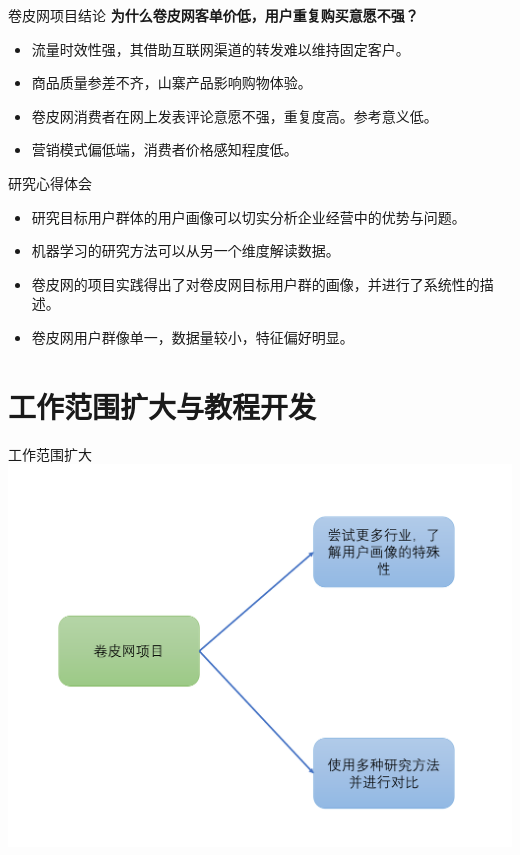 \documentclass[10pt, aspectratio=32,handout]{beamer}
\begin{document}
\begin{frame}{卷皮网项目结论}
\textbf{为什么卷皮网客单价低，用户重复购买意愿不强？}\newline
  \begin{itemize}
    \item 流量时效性强，其借助互联网渠道的转发难以维持固定客户。\newline
    \item 商品质量参差不齐，山寨产品影响购物体验。\newline
    \item 卷皮网消费者在网上发表评论意愿不强，重复度高。参考意义低。\newline
    \item 营销模式偏低端，消费者价格感知程度低。
  \end{itemize}


\end{frame}

\begin{frame}{研究心得体会}
  \begin{itemize}
    \item 研究目标用户群体的用户画像可以切实分析企业经营中的优势与问题。\newline
    \item 机器学习的研究方法可以从另一个维度解读数据。\newline
    \item 卷皮网的项目实践得出了对卷皮网目标用户群的画像，并进行了系统性的描述。\newline
    \item 卷皮网用户群像单一，数据量较小，特征偏好明显。\newline
  \end{itemize}
\end{frame}

\section{工作范围扩大与教程开发}

\begin{frame}{工作范围扩大}
\includegraphics[height=0.7\paperheight]{amplify}
\end{frame}
\end{document}

